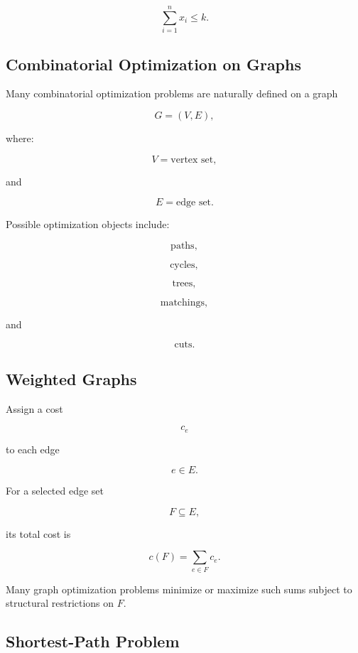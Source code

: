 \[
\boxed{
\sum_{i=1}^{n}
x_i
\leq
k.
}
\]

\subsection{Combinatorial Optimization on Graphs}
\label{subsec:combinatorial-graph-optimization}

Many combinatorial optimization problems are naturally defined on a graph

\[
\boxed{
G=(V,E),
}
\]

where:

\[
V
=
\text{vertex set},
\]

and

\[
E
=
\text{edge set}.
\]

Possible optimization objects include:

\[
\boxed{
\text{paths},
}
\]

\[
\boxed{
\text{cycles},
}
\]

\[
\boxed{
\text{trees},
}
\]

\[
\boxed{
\text{matchings},
}
\]

and

\[
\boxed{
\text{cuts}.
}
\]

\subsection{Weighted Graphs}
\label{subsec:weighted-graphs-combinatorial}

Assign a cost

\[
c_e
\]

to each edge

\[
e\in E.
\]

For a selected edge set

\[
F\subseteq E,
\]

its total cost is

\[
\boxed{
c(F)
=
\sum_{e\in F}
c_e.
}
\]

Many graph optimization problems minimize or maximize such sums subject to
structural restrictions on \(F\).

\subsection{Shortest-Path Problem}
\label{subsec:combinatorial-shortest-path}

